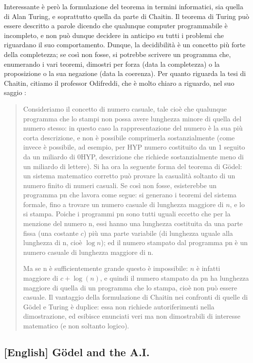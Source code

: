 \documentclass[a4paper,10pt]{article}
\begin{document}
Interessante è però la formulazione del teorema in termini informatici, sia quella di Alan Turing, e soprattutto quella da parte di Chaitin.
Il teorema di Turing può essere descritto a parole dicendo che qualunque computer programmabile è incompleto, e non può dunque decidere in anticipo su tutti i problemi che riguardano il suo comportamento.
Dunque, la decidibilità è un concetto più forte della completezza; se così non fosse, si potrebbe scrivere un programma che, enumerando i vari teoremi, dimostri per forza (data la completezza) o la proposizione o la sua negazione (data la coerenza).
Per quanto riguarda la tesi di Chaitin, citiamo il professor Odifreddi, che è molto chiaro a riguardo, nel suo saggio \cite{metamorfosi}:
\begin{quote}
Consideriamo il concetto di numero casuale, tale cioè che qualunque programma che lo stampi non possa avere lunghezza minore di quella del numero stesso: in questo caso la rappresentazione del numero è la sua più corta descrizione, e non è possibile comprimerla sostanzialmente (come invece è possibile, ad esempio, per HYP numero costituito da un 1 seguito da un miliardo di 0HYP, descrizione che richiede sostanzialmente meno di un miliardo di lettere).
Si ha ora la seguente forma del teorema di Gödel: un sistema matematico corretto può provare la casualità soltanto di un numero finito di numeri casuali. Se così non fosse, esisterebbe un programma pn che lavora come segue: si generano i teoremi del sistema formale, fino a trovare un numero casuale di lunghezza maggiore di $n$, e lo si stampa. Poiche i programmi pn sono tutti uguali eccetto che per la menzione del numero n, essi hanno una lunghezza costituita da una parte fissa (una costante $c$) più una parte variabile (di lunghezza uguale alla lunghezza di n, cioè $\log n$); ed il numero stampato dal programma pn è un numero casuale di lunghezza maggiore di n.

Ma se n è sufficientemente grande questo è impossibile: $n$ è infatti maggiore di $c + \log(n)$, e quindi il numero stampato da pn ha lunghezza maggiore di quella di un programma che lo stampa, cioè non può essere casuale.
Il vantaggio della formulazione di Chaitin nei confronti di quelle di Gödel e Turing è duplice: essa non richiede autoriferimenti nella dimostrazione, ed esibisce enunciati veri ma non dimostrabili di interesse matematico (e non soltanto logico).
\end{quote}

\subsection{[English] Gödel and the A.I.}
\end{document}
